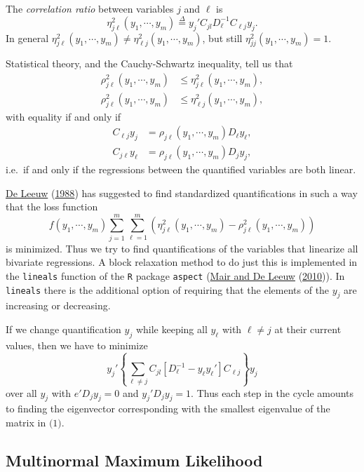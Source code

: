 \documentclass[
  12pt,
]{book}
\begin{document}
The \emph{correlation ratio} between variables \(j\) and \(\ell\) is
\[
\eta^2_{j\ell}(y_1,\cdots,y_m)\mathop{=}\limits^{\Delta}y_j'C_{jl}^{\ }D_\ell^{-1}C_{\ell j}^{\ }y_j^{\ }.
\]
In general \(\eta^2_{j\ell}(y_1,\cdots,y_m)\not=\eta^2_{\ell j}(y_1,\cdots,y_m)\), but still \(\eta^2_{jj}(y_1,\cdots,y_m)=1\).

Statistical theory, and the Cauchy-Schwartz inequality, tell us that
\begin{align*}
\rho_{j\ell}^2(y_1,\cdots,y_m)&\leq \eta_{j\ell}^2(y_1,\cdots,y_m),\\
\rho_{j\ell}^2(y_1,\cdots,y_m)&\leq\eta_{\ell j}^2(y_1,\cdots,y_m),
\end{align*}
with equality if and only if
\begin{align*}
C_{\ell j}y_j&=\rho_{j\ell}(y_1,\cdots,y_m)D_\ell y_\ell,\\
C_{j\ell}y_\ell&=\rho_{j\ell}(y_1,\cdots,y_m)D_j y_j,
\end{align*}
i.e.~if and only if the regressions between the quantified variables are both linear.

\protect\hyperlink{ref-deleeuw_A_88a}{De Leeuw} (\protect\hyperlink{ref-deleeuw_A_88a}{1988}) has suggested to find standardized quantifications in such a way that the loss function
\[
f(y_1,\cdots,y_m)\sum_{j=1}^m\sum_{\ell=1}^m(\eta_{j\ell}^2(y_1,\cdots,y_m)-\rho_{j\ell}^2(y_1,\cdots,y_m))
\]
is minimized. Thus we try to find quantifications of the variables that linearize all bivariate regressions. A block relaxation method to do just this is implemented in the \texttt{lineals} function of the \texttt{R} package \texttt{aspect} (\protect\hyperlink{ref-mair_deleeuw_A_10}{Mair and De Leeuw} (\protect\hyperlink{ref-mair_deleeuw_A_10}{2010})). In \texttt{lineals} there is the additional option of requiring that the elements of the \(y_j\) are increasing or decreasing.

If we change quantification \(y_j\) while keeping all \(y_\ell\) with \(\ell\not= j\) at their current values, then we have to minimize
\[
y_j'\left\{\sum_{\ell\not= j}C_{jl}^{\ }\left[D_\ell^{-1}-y_\ell^{\ }y_\ell'\right]C_{\ell j}^{\ }\right\}y_j^{\ }\tag{1}
\]
over all \(y_j\) with \(e'D_jy_j=0\) and \(y_j'D_j^{\ }y_j^{\ }=1\). Thus each step in the cycle
amounts to finding the eigenvector corresponding with the smallest eigenvalue of the matrix
in \(\text{(1)}\).

\hypertarget{blockrelaxation:additionalexamples:multinormalmaximumlikelihood}{%
\subsection{Multinormal Maximum Likelihood}\label{blockrelaxation:additionalexamples:multinormalmaximumlikelihood}}
\end{document}
